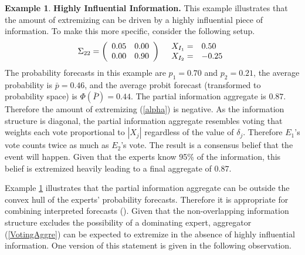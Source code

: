 \documentclass[11pt]{article}
\theoremstyle{definition}
\newtheorem{example}[theorem]{Example}
\theoremstyle{definition}
\begin{document}
\begin{example}
\label{KeyInfo}
\textbf{Highly Influential Information.} This example illustrates that the amount of extremizing can be driven by a highly influential piece of information. To make this more specific, consider the following setup.
\begin{align*}
\Sigma_{22} =  \left(\begin{array}{c c}
0.05 & 0.00\\
0.00 & 0.90 \\
 \end{array}\right)
  && 
  \begin{array}{l l}
X_{I_1} =& 0.50\\
X_{I_2} =& -0.25
 \end{array}
\end{align*}
The probability forecasts in this example are $p_1 = 0.70$ and $p_2 = 0.21$, the average probability is $\bar{p} = 0.46$, and the average probit forecast (transformed to probability space) is $\Phi(\bar{P}) = 0.44$.  The partial information aggregate is $0.87$. Therefore the amount of extremizing (\ref{alpha}) is negative. As the information structure is diagonal, the partial information aggregate resembles voting that weights each vote proportional to $|X_j|$ regardless of the value of $\delta_j$. Therefore $E_1$'s vote counts twice as much as $E_2$'s vote. The result is a consensus belief that the event will happen. Given that the experts know 95\% of the information, this belief is extremized heavily leading to a final aggregate of $0.87$. 
\end{example}

Example \ref{KeyInfo} illustrates that the partial information aggregate can be outside the convex hull of the experts' probability forecasts. Therefore it is appropriate for combining interpreted forecasts (\cite{parunak2013characterizing}). Given that the non-overlapping information structure excludes the possibility of a dominating expert, aggregator (\ref{VotingAggre}) can be expected to extremize in the absence of highly influential information. 
% 
One version of this statement is given in the following observation.
 
\end{document}
